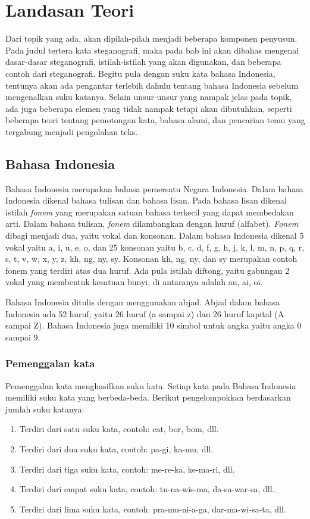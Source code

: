 \chapter{Landasan Teori}
\label{chap:landasan_teori}

Dari topik yang ada, akan dipilah-pilah menjadi beberapa komponen penyusun. Pada judul tertera kata steganografi, maka pada bab ini akan dibahas mengenai dasar-dasar steganografi, istilah-istilah yang akan digunakan, dan beberapa contoh dari steganografi. Begitu pula dengan suku kata bahasa Indonesia, tentunya akan ada pengantar terlebih dahulu tentang bahasa Indonesia sebelum mengenalkan suku katanya. Selain unsur-unsur yang nampak jelas pada topik, ada juga beberapa elemen yang tidak nampak tetapi akan dibutuhkan, seperti beberapa teori tentang pemotongan kata, bahasa alami, dan pencarian temu yang tergabung menjadi pengolahan teks.

\section{Bahasa Indonesia}\cite{eyd:2009}
Bahasa Indonesia merupakan bahasa pemersatu Negara Indonesia. Dalam bahasa Indonesia dikenal bahasa tulisan dan bahasa lisan. Pada bahasa lisan dikenal istilah \textit{fonem} yang merupakan satuan bahasa terkecil yang dapat membedakan arti. Dalam bahasa tulisan, \textit{fonem} dilambangkan dengan huruf (alfabet). \textit{Fonem} dibagi menjadi dua, yaitu vokal dan konsonan. Dalam bahasa Indonesia dikenal 5 vokal yaitu a, i, u, e, o, dan 25 konsonan yaitu b, c, d, f, g, h, j, k, l, m, n, p, q, r, s, t, v, w, x, y, z, kh, ng, ny, sy. Konsonan kh, ng, ny, dan sy merupakan contoh fonem yang terdiri atas dua huruf. Ada pula istilah diftong, yaitu gabungan 2 vokal yang membentuk kesatuan bunyi, di antaranya adalah au, ai, oi.

Bahasa Indonesia ditulis dengan menggunakan abjad. Abjad dalam bahasa Indonesia ada 52 huruf, yaitu 26 huruf (a sampai z) dan 26 huruf kapital (A sampai Z). Bahasa Indonesia juga memiliki 10 simbol untuk angka yaitu angka 0 sampai 9.

\subsection{Pemenggalan kata}
Pemenggalan kata menghasilkan suku kata. Setiap kata pada Bahasa Indonesia memiliki suku kata yang berbeda-beda. 
Berikut pengelompokkan berdasarkan jumlah suku katanya:

\begin{enumerate}
	\item Terdiri dari satu suku kata, contoh: cat, bor, bom, dll.
	\item Terdiri dari dua suku kata, contoh: pa-gi, ka-mu, dll.
	\item Terdiri dari tiga suku kata, contoh: me-re-ka, ke-ma-ri, dll.
	\item Terdiri dari empat suku kata, contoh: tu-na-wis-ma, da-sa-war-sa, dll.
	\item Terdiri dari lima suku kata, contoh: pra-mu-ni-a-ga, dar-ma-wi-sa-ta, dll.
\end{enumerate}

